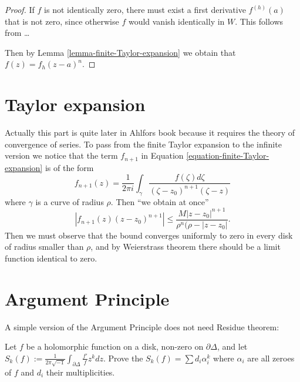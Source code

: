 \begin{proof}
If $f$ is not identically zero, there must exist a first derivative $f^{
(h)}(a)$ that is not zero, since otherwise $f$ would vanish identically in $W$.
This follows from … 

Then by Lemma \ref{lemma-finite-Taylor-expansion} we obtain that
$f(z)=f_h(z-a)^n$.
\end{proof}

\section{Taylor expansion}
\label{section-Taylor-expansion}

\noindent
Actually this part is quite later in Ahlfors book because it requires
the theory of convergence of series.
To pass from the finite Taylor expansion to the
infinite version we notice that the 
term $f_{n+1}$ in Equation \ref{equation-finite-Taylor-expansion}
is of the form
$$
f_{n+1}(z)=\frac{1}{2\pi i}\int_\gamma \frac{f(\zeta)d\zeta}
{(\zeta-z_0)^{n+1}(\zeta-z)}
$$
where $\gamma$ is a curve of radius $\rho$.
Then ``we obtain at once''
$$
|f_{n+1}(z)(z-z_0)^{n+1}|\leq \frac{M|z-z_0|^{n+1}}{\rho^n(\rho-|z-z_0|}.
$$
Then we must observe that the bound converges uniformly
to zero in every disk of radius smaller than $\rho$,
and by Weierstrass theorem there should be a limit
function identical to zero.

\section{Argument Principle}
\label{section-argument-principle}

\noindent
A simple version of the Argument Principle does not need Residue theorem:

\begin{exercise}
\label{exercise-argument-principle}
Let $f$ be a holomorphic function on a disk, non-zero on $\partial \Delta$, and
let $S_k(f):=\frac{1}{2\pi\sqrt{-1}}\int_{\partial\Delta}\frac{f'}{f}z^kdz$.
Prove the $S_k(f)=\sum d_i\alpha_i^k$ where $\alpha_i$ are all zeroes of $f$ and
$d_i$ their multiplicities.
\end{exercise}

